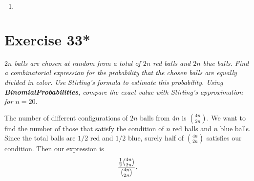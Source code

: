 \documentclass{abrice}
\begin{document}
\bigskip

\begin{enumerate}[label=(\alph*)]
\item
\end{enumerate}

\section{Exercise 33*}

\emph{$2n$ balls are chosen at random from a total of $2n$ red balls
  and $2n$ blue balls.  Find a combinatorial expression for the
  probability that the chosen balls are equally divided in color.  Use
  Stirling's formula to estimate this probability.  Using
  \textbf{BinomialProbabilities}, compare the exact value with
  Stirling's approximation for $n = 20$.}

\bigskip

The number of different configurations of $2n$ balls from $4n$ is ${4n
\choose 2n}$. We want to find the number of those that satisfy the
condition of $n$ red balls and $n$ blue balls. Since the total balls
are $1/2$ red and $1/2$ blue, surely half of ${4n \choose 2n}$
satisfies our condition. Then our expression is
\[
{{1 \over 2}{4n \choose 2n} \over {4n \choose 2n}}.
\]
\end{document}
